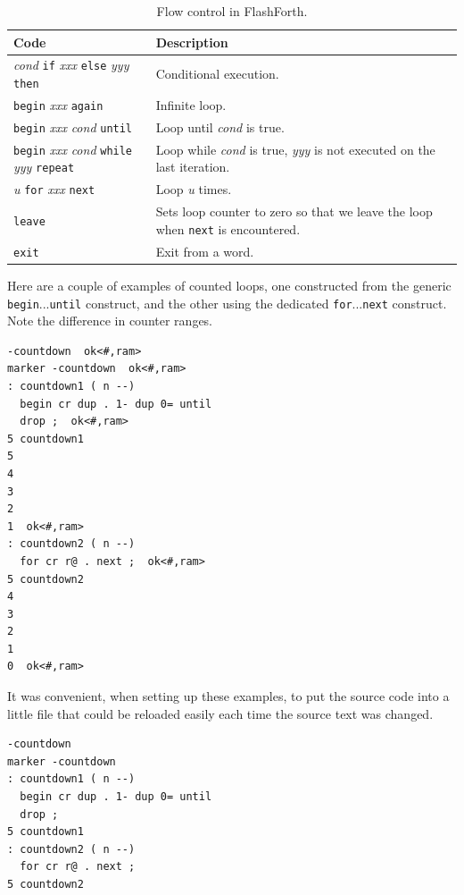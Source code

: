\documentclass[12pt,a4paper]{article}
\begin{document}
\begin{table}[htb]
 \caption{Flow control in FlashForth.} 
 \label{table:looping-words}
 \centering
 \begin{tabular}{ll}
  \\ \hline
  Code & Description \\
  \hline
  \textit{cond} \verb!if! \textit{xxx} \verb!else! \textit{yyy} \verb!then! & Conditional execution. \\
  \verb!begin! \textit{xxx} \verb!again!  & Infinite loop.  \\
  \verb!begin! \textit{xxx} \textit{cond} \verb!until! & 
   Loop until \textit{cond} is true. \vspace{5pt} \\
  \verb!begin! \textit{xxx} \textit{cond} \verb!while! \textit{yyy} \verb!repeat! & 
   \parbox{0.5\textwidth}
    {Loop while \textit{cond} is true, \textit{yyy} is not executed on the last iteration.} 
    \vspace{5pt} \\
  \textit{u} \verb!for! \textit{xxx} \verb!next! & Loop \textit{u} times. \vspace{5pt} \\
  \verb!leave! & 
   \parbox{0.5\textwidth}
    {Sets loop counter to zero so that we leave the loop when \texttt{next} is encountered.} \vspace{5pt} \\
  \verb!exit! & \parbox{0.5\textwidth}{Exit from a word.} \vspace{5pt} \\
  \hline
 \end{tabular}
\end{table}

\medskip
Here are a couple of examples of counted loops, 
one constructed from the generic \verb!begin!...\verb!until! construct,
and the other using the dedicated \verb!for!...\verb!next! construct.
Note the difference in counter ranges.
\begin{verbatim}
-countdown  ok<#,ram>
marker -countdown  ok<#,ram>
: countdown1 ( n --) 
  begin cr dup . 1- dup 0= until 
  drop ;  ok<#,ram>
5 countdown1 
5 
4 
3 
2 
1  ok<#,ram>
: countdown2 ( n --) 
  for cr r@ . next ;  ok<#,ram>
5 countdown2 
4 
3 
2 
1 
0  ok<#,ram>
\end{verbatim}
It was convenient, when setting up these examples, to put the source code into a little file
that could be reloaded easily each time the source text was changed.
\begin{verbatim}
-countdown
marker -countdown
: countdown1 ( n --)
  begin cr dup . 1- dup 0= until
  drop ;
5 countdown1
: countdown2 ( n --)
  for cr r@ . next ;
5 countdown2
\end{verbatim}
\end{document}
